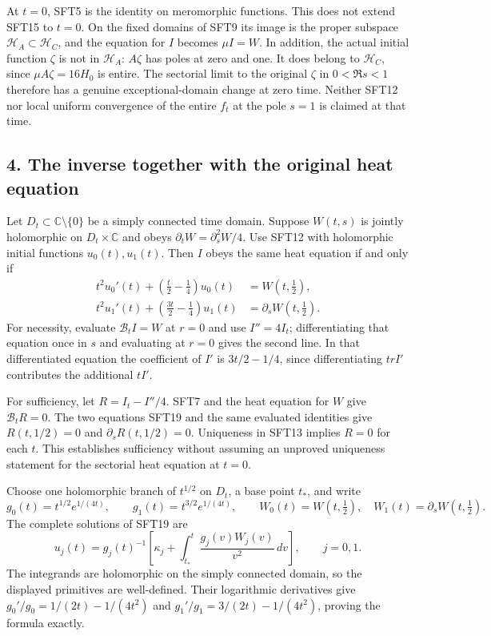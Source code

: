 \documentclass[
  10pt,
  a4paper,
]{article}
\begin{document}
At \(t=0\), SFT5 is the identity on meromorphic functions. This does not
extend SFT15 to \(t=0\). On the fixed domains of SFT9 its image is the
proper subspace \(\mathcal H_A\subset\mathcal H_C\), and the equation
for \(I\) becomes \(\mu I=W\). In addition, the actual initial function
\(\zeta\) is not in \(\mathcal H_A\): \(A\zeta\) has poles at zero and
one. It does belong to \(\mathcal H_C\), since \(\mu A\zeta=16H_0\) is
entire. The sectorial limit to the original \(\zeta\) in \(0<\Re s<1\)
therefore has a genuine exceptional-domain change at zero time. Neither
SFT12 nor local uniform convergence of the entire \(f_t\) at the pole
\(s=1\) is claimed at that time.

\subsection{4. The inverse together with the original heat
equation}\label{the-inverse-together-with-the-original-heat-equation}

Let \(D_t\subset\mathbb C\setminus\{0\}\) be a simply connected time
domain. Suppose \(W(t,s)\) is jointly holomorphic on
\(D_t\times\mathbb C\) and obeys \(\partial_tW=\partial_s^2W/4\). Use
SFT12 with holomorphic initial functions \(u_0(t),u_1(t)\). Then \(I\)
obeys the same heat equation if and only if \[
 \boxed{\begin{aligned}
  t^2u_0'(t)+(\tfrac t2-\tfrac14)u_0(t)
      &=W(t,\tfrac12),\\
  t^2u_1'(t)+(\tfrac{3t}2-\tfrac14)u_1(t)
      &=\partial_sW(t,\tfrac12).
 \end{aligned}}
 \tag{SFT19}
\] For necessity, evaluate \(\mathcal B_tI=W\) at \(r=0\) and use
\(I''=4I_t\); differentiating that equation once in \(s\) and evaluating
at \(r=0\) gives the second line. In that differentiated equation the
coefficient of \(I'\) is \(3t/2-1/4\), since differentiating \(trI'\)
contributes the additional \(tI'\).

For sufficiency, let \(R=I_t-I''/4\). SFT7 and the heat equation for
\(W\) give \(\mathcal B_tR=0\). The two equations SFT19 and the same
evaluated identities give \(R(t,1/2)=0\) and \(\partial_sR(t,1/2)=0\).
Uniqueness in SFT13 implies \(R=0\) for each \(t\). This establishes
sufficiency without assuming an unproved uniqueness statement for the
sectorial heat equation at \(t=0\).

Choose one holomorphic branch of \(t^{1/2}\) on \(D_t\), a base point
\(t_*\), and write \[
 g_0(t)=t^{1/2}e^{1/(4t)},\qquad
 g_1(t)=t^{3/2}e^{1/(4t)},\qquad
 W_0(t)=W(t,\tfrac12),\quad
 W_1(t)=\partial_sW(t,\tfrac12).
\] The complete solutions of SFT19 are \[
 u_j(t)=g_j(t)^{-1}
     \left[\kappa_j+
       \int_{t_*}^t\frac{g_j(v)W_j(v)}{v^2}\,dv\right],
 \qquad j=0,1.
 \tag{SFT20}
\] The integrands are holomorphic on the simply connected domain, so the
displayed primitives are well-defined. Their logarithmic derivatives
give \(g_0'/g_0=1/(2t)-1/(4t^2)\) and \(g_1'/g_1=3/(2t)-1/(4t^2)\),
proving the formula exactly.
\end{document}
